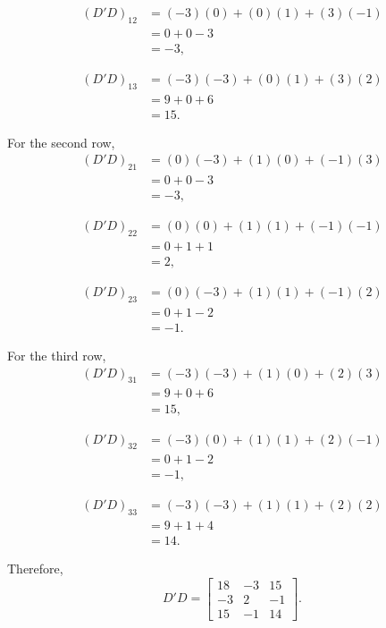\documentclass[12pt]{article}
\begin{document}
	\[
	\begin{aligned}
		(D'D)_{12}
		&=(-3)(0)+(0)(1)+(3)(-1)\\
		&=0+0-3\\
		&=-3,
	\end{aligned}
	\]
	
	\[
	\begin{aligned}
		(D'D)_{13}
		&=(-3)(-3)+(0)(1)+(3)(2)\\
		&=9+0+6\\
		&=15.
	\end{aligned}
	\]
	
	For the second row,
	\[
	\begin{aligned}
		(D'D)_{21}
		&=(0)(-3)+(1)(0)+(-1)(3)\\
		&=0+0-3\\
		&=-3,
	\end{aligned}
	\]
	
	\[
	\begin{aligned}
		(D'D)_{22}
		&=(0)(0)+(1)(1)+(-1)(-1)\\
		&=0+1+1\\
		&=2,
	\end{aligned}
	\]
	
	\[
	\begin{aligned}
		(D'D)_{23}
		&=(0)(-3)+(1)(1)+(-1)(2)\\
		&=0+1-2\\
		&=-1.
	\end{aligned}
	\]
	
	For the third row,
	\[
	\begin{aligned}
		(D'D)_{31}
		&=(-3)(-3)+(1)(0)+(2)(3)\\
		&=9+0+6\\
		&=15,
	\end{aligned}
	\]
	
	\[
	\begin{aligned}
		(D'D)_{32}
		&=(-3)(0)+(1)(1)+(2)(-1)\\
		&=0+1-2\\
		&=-1,
	\end{aligned}
	\]
	
	\[
	\begin{aligned}
		(D'D)_{33}
		&=(-3)(-3)+(1)(1)+(2)(2)\\
		&=9+1+4\\
		&=14.
	\end{aligned}
	\]
	
	Therefore,
	\[
	\boxed{
		D'D=
		\begin{bmatrix}
			18&-3&15\\
			-3&2&-1\\
			15&-1&14
	\end{bmatrix}}.
	\]
	
\end{document}
